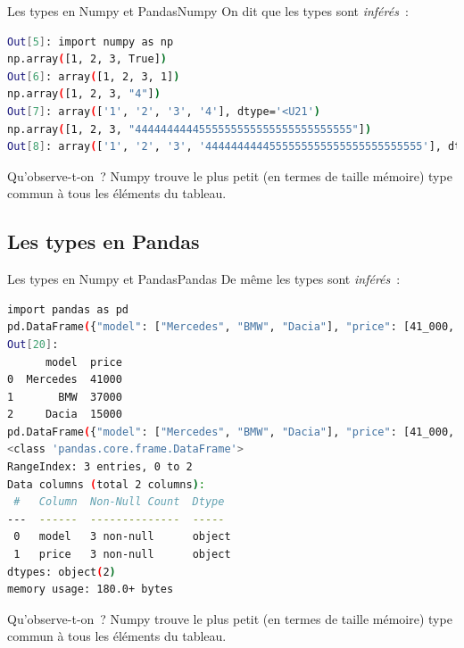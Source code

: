 \documentclass{beamer}
\begin{document}
    \begin{frame}[fragile]{Les types en Numpy et Pandas}{Numpy}
        On dit que les types sont \textit{inférés}~:
        \begin{lstlisting}[language=bash]
Out[5]: import numpy as np
np.array([1, 2, 3, True])
Out[6]: array([1, 2, 3, 1])
np.array([1, 2, 3, "4"])
Out[7]: array(['1', '2', '3', '4'], dtype='<U21')
np.array([1, 2, 3, "4444444444555555555555555555555555"])
Out[8]: array(['1', '2', '3', '4444444444555555555555555555555555'], dtype='<U34')
        \end{lstlisting}
        Qu'observe-t-on~?
        \pause
        \bigbreak
        Numpy trouve le plus petit (en termes de taille mémoire) type commun à tous les éléments du tableau.
    \end{frame}

    \subsection{Les types en Pandas}\label{pandas-typing}
    \begin{frame}[fragile]{Les types en Numpy et Pandas}{Pandas}
        De même les types sont \textit{inférés}~:
        \begin{lstlisting}[language=bash,basicstyle=\tiny\ttfamily]
import pandas as pd
pd.DataFrame({"model": ["Mercedes", "BMW", "Dacia"], "price": [41_000, 37_000, 15_000]})
Out[20]:
      model  price
0  Mercedes  41000
1       BMW  37000
2     Dacia  15000
pd.DataFrame({"model": ["Mercedes", "BMW", "Dacia"], "price": [41_000, 37_000, "15_000"]}).info()
<class 'pandas.core.frame.DataFrame'>
RangeIndex: 3 entries, 0 to 2
Data columns (total 2 columns):
 #   Column  Non-Null Count  Dtype
---  ------  --------------  -----
 0   model   3 non-null      object
 1   price   3 non-null      object
dtypes: object(2)
memory usage: 180.0+ bytes
        \end{lstlisting}
        Qu'observe-t-on~?
        \pause
        \bigbreak
        Numpy trouve le plus petit (en termes de taille mémoire) type commun à tous les éléments du tableau.
    \end{frame}
\end{document}
